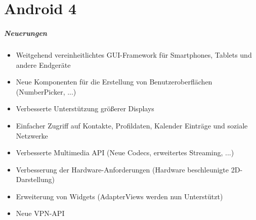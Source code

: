 \part{Android 4}
\frame{\partpage}
\begin{frame}[label=android_four]
   \frametitle{Neuerungen}
   \begin{itemize}
      \item Weitgehend vereinheitlichtes GUI-Framework für Smartphones, Tablets und 
         andere Endgeräte
      \item Neue Komponenten für die Erstellung von Benutzeroberflächen (NumberPicker, ...)
      \item Verbesserte Unterstützung größerer Displays
      \item Einfacher Zugriff auf Kontakte, Profildaten, Kalender Einträge 
         und soziale Netzwerke
      \item Verbesserte Multimedia API (Neue Codecs, erweitertes Streaming, ...)
      \item Verbesserung der Hardware-Anforderungen (Hardware beschleunigte 2D-Darstellung)
      \item Erweiterung von Widgets (AdapterViews werden nun Unterstützt)
      \item Neue VPN-API
   \end{itemize}
\end{frame}
